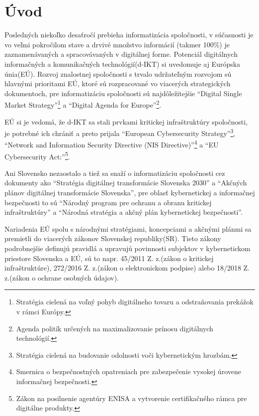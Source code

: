 \chapter*{Úvod} %

Posledných niekoľko desaťročí prebieha informatizácia spoločnosti, v súčasnosti je vo veľmi pokročilom stave a drvivé
množstvo informácií (takmer 100\%) je zaznamenávaných a spracovávaných v digitálnej forme. Potenciál digitálnych
informačných a komunikačných technológií(d-IKT) si uvedomuje aj Európska únia(EÚ). Rozvoj znalostnej spoločnosti s trvalo
udržateľným rozvojom sú hlavnými prioritami EÚ, ktoré sú rozpracované vo viacerých strategických dokumentoch, pre 
informatizáciu spoločnosti sú najdôležitejšie \enquote{Digital Single Market Strategy}\footnote{Stratégia cielená na
voľný pohyb digitálneho tovaru a odstraňovania prekážok v rámci Európy.} a \enquote{Digital Agenda for Europe}\footnote{Agenda
politík určených na maximalizovanie prínosu digitálnych technológií.}. 

EÚ si je vedomá, že d-IKT sa stali prvkami kritickej infraštruktúry spoločnosti, je potrebné ich chrániť a preto prijala
\enquote{European Cybersecurity Strategy}\footnote{Stratégia cielená na budovanie odolnosti voči kybernetickým hrozbám.},
\enquote{Network and Information Security Directive (NIS Directive)}\footnote{Smernica o bezpečnostných opatreniach
pre zabezpečenie vysokej úrovene informačnej bezpečnosti.} a \enquote{EU Cybersecurity Act:}\footnote{Zákon na posilnenie
agentúry ENISA a vytvorenie certifikačného rámca pre digitálne produkty.}.

Ani Slovensko nezaostalo a tiež sa snaží o informatizáciu spoločnosti cez dokumenty ako \enquote{Stratégia digitálnej
transformácie Slovenska 2030} a \enquote{Akčných plánov digitálnej transformácie Slovenska}, pre oblasť kybernetickej
a informačnej bezpečnosti to sú \enquote{Národný program pre ochranu a obranu kritickej infraštruktúry} a
\enquote{Národná stratégia a akčný plán kybernetickej bezpečnosti}.

Nariadenia EÚ spolu s národnými stratégiami, koncepciami a akčnými plánmi sa premietli do viacerých zákonov Slovenskej
republiky(SR). Tieto zákony podrobnejšie definujú pravidlá a upravujú povinnosti subjektov v kybernetickom priestore
Slovenska a EÚ, sú to napr. 45/2011 Z. z.(zákon o kritickej infraštruktúre), 272/2016 Z. z.(zákon o elektronickom podpise)
alebo 18/2018 Z. z.(zákon o ochrane osobných údajov).


